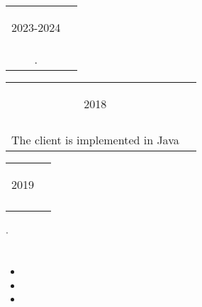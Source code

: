 \documentclass{article}
\newif\ifen
\newif\ifru
\newcommand{\en}[1]{\ifen#1\fi}
\newcommand{\ru}[1]{\ifru#1\fi}
\newcommand{\entry}[3]{
	\begin{tabular}{ c | c }
    \begin{minipage}{0.05\linewidth}
    	\begin{center}
    		#1
    	\end{center}
    \end{minipage} 
    &
    \begin{minipage}{0.85\linewidth}
        \textbf{#2} \\ \footnotesize{#3}
    \end{minipage}
    \end{tabular}
}
\begin{document}
    \vspace{.5em}
     
    \section{\ru{Проекты}}
        \entry {2023-2024}
        {\ru{Реализация алгоритмов разбиения графов}\en{Implementation of graph partitioning algorithms}}
        {\ru{Реализация алгоритмов в рамках научной работы по теме распределения работ по процессорам}\en{Implementation of algorithms as part of scientific work on the distribution of workload across processors}.} 
    
        \vspace{.5em}
    
        \entry {2018}
        {\ru{Клиент-серверное приложение}\en{Client-Server Application}}
        {\ru{Сервер реализован на языке Python3 (Flask, SQLAlchemy);\\
        Клиент - на языке Java}\en{The server is implemented in Python3 (Flask, SQLAlchemy)\\The client is implemented in Java}.} 
    

    
        \vspace{.5em}

        \entry {2019}
        {\ru{Симулятор движения небесных тел}\en{Celestial bodies motion simulator}}
        {\ru{Решение задачи $n$ тел с помощью метода Рунге-Кутта 1-го порядка на Python3 с использованием NumPy}\en{Solving n-body problem with 1st order Runge-Kutta method in Python3 using NumPy}}.
    
        \vspace{.5em}

    \section{\ru{Достижения}}
        \begin{itemize}
            \item \ru{Призёр регионального этапа ВСОШ по информатике}
            \item \ru{Победитель первой степени олимпиады ИТМО по информатике}
            \item \ru{Хакатон TulaHack - 4 место}
        \end{itemize}
    
\end{document}
